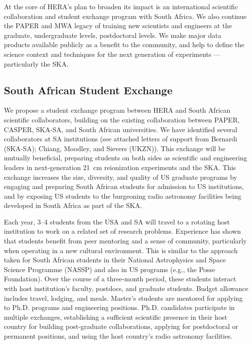 \documentclass[preprint]{aastex}
\newcommand{\compress}{\vspace{-0.3in}}
\begin{document}

At the core
of HERA's plan to broaden its impact
is an international scientific collaboration and student
exchange program with South Africa.  We also continue the PAPER
and MWA legacy of training new scientists and engineers at the graduate,
undergraduate levels, postdoctoral levels.  We make major data products
available publicly as a benefit to the community, and help to define the
science context and techniques for the next generation of experiments ---
particularly the SKA.

\compress
\subsection{South African Student Exchange}

We propose 
a student exchange program
between HERA and South African scientific collaborators,
building on the existing
collaboration between PAPER, CASPER, SKA-SA, and South African universities.
We have identified several collaborators at SA institutions (see attached
letters of support from Bernardi (SKA-SA); Chiang, Moodley, and 
Sievers (UKZN)).  This exchange will be mutually beneficial,
preparing students on both sides as scientific and engineering leaders
in next-generation 21~cm
reionization experiments and the SKA.  This
exchange increases the size, diversity, and quality of US graduate programs by
engaging and preparing South African students for admission to US institutions,
and by exposing US students to the burgeoning radio astronomy facilities being
developed in South Africa as part of the SKA. %

Each year,
3--4 students from the USA and SA will
travel to a rotating host institution to work on a related set of
research problems.  
Experience has shown that students benefit from peer mentoring and
a sense of community, particularly when operating in a new cultural
environment.  This is similar to the approach taken for South African students
in their National Astrophysics and Space Science Programme (NASSP)
and also in US programs (e.g., the Posse Foundation).
Over the course of a three-month period,
these students interact with host institution's
faculty, postdocs, and graduate students.  Budget
allowance includes travel, lodging, and meals.  Master's students 
are mentored for applying to Ph.D. programs and engineering positions.  Ph.D.
candidates participate in multiple exchanges, 
establishing a sufficient scientific presence in their host country for
building post-graduate collaborations, applying for postdoctoral or permanent
positions, and using the host
country's radio astronomy facilities.  %
\end{document}
